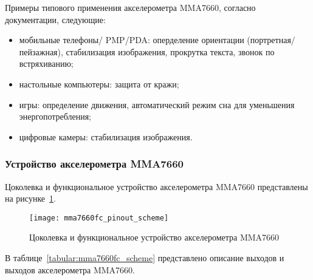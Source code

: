 \documentclass[document.tex]{subfiles}
\begin{document}
\noindent
Примеры типового применения акселерометра MMA7660, согласно документации, следующие:
\begin{itemize} 
	\item мобильные телефоны/ PMP/PDA: оперделение ориентации (портретная/пейзажная), стабилизация изображения, прокрутка текста, звонок по встряхиванию;
	\item настольные компьютеры: защита от кражи;
	\item игры: определение движения, автоматический режим сна для уменьшения энерго\-потребления;
	\item цифровые камеры: стабилизация изображения. \cite{accelerometer_mma7660}
\end{itemize}

\clearpage
\subsubsection{Устройство акселерометра MMA7660}
Цоколевка и функциональное устройство акселерометра MMA7660 представлены на ри\-сунке~\ref{fig:mma7660fc_pinout_scheme}.

\begin{figure}[h]
\centering
\texttt{[image: mma7660fc\_pinout\_scheme]}
\caption{Цоколевка и функциональное устройство акселерометра MMA7660}
\label{fig:mma7660fc_pinout_scheme}
\end{figure}

В таблице~\ref{tabular:mma7660fc_scheme} представлено описание выходов и выходов акселерометра MMA7660. 

\begin{table}[h]
\medskip
{}
\medskip
\caption{Общие характеристики цифровых акселерометров}
\label{tabular:mma7660fc_scheme}
\end{table}
\end{document}
